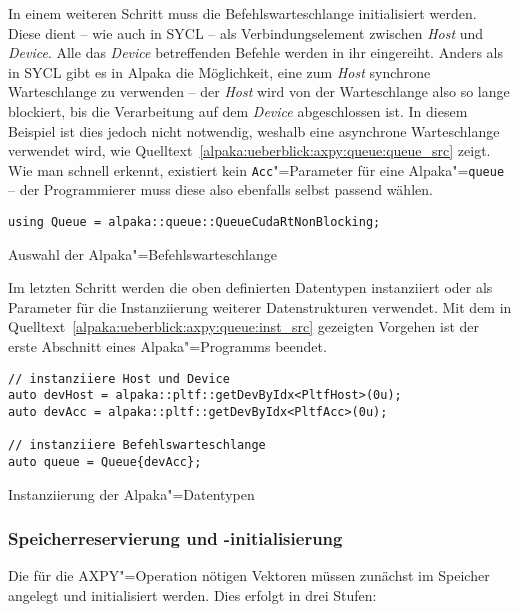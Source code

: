 In einem weiteren Schritt muss die Befehlswarteschlange initialisiert werden.
Diese dient -- wie auch in SYCL -- als Verbindungselement zwischen \textit{Host}
und \textit{Device}. Alle das \textit{Device} betreffenden Befehle werden in
ihr eingereiht. Anders als in SYCL gibt es in Alpaka die Möglichkeit, eine zum
\textit{Host} synchrone Warteschlange zu verwenden -- der \textit{Host} wird von
der Warteschlange also so lange blockiert, bis die Verarbeitung auf dem
\textit{Device} abgeschlossen ist. In diesem Beispiel ist dies jedoch nicht
notwendig, weshalb eine asynchrone Warteschlange verwendet wird, wie
Quelltext~\ref{alpaka:ueberblick:axpy:queue:queue_src} zeigt. Wie man schnell
erkennt, existiert kein \texttt{Acc}"=Parameter für eine Alpaka"=\texttt{queue}
-- der Programmierer muss diese also ebenfalls selbst passend wählen.

\begin{code}
    \begin{verbatim}
using Queue = alpaka::queue::QueueCudaRtNonBlocking;
    \end{verbatim}
    \caption{Auswahl der Alpaka"=Befehlswarteschlange}
    \label{alpaka:ueberblick:axpy:queue:queue_src}
\end{code}

Im letzten Schritt werden die oben definierten Datentypen instanziiert oder als
Parameter für die Instanziierung weiterer Datenstrukturen verwendet. Mit dem
in Quelltext~\ref{alpaka:ueberblick:axpy:queue:inst_src} gezeigten Vorgehen ist
der erste Abschnitt eines Alpaka"=Programms beendet.

\begin{code}
    \begin{verbatim}
// instanziiere Host und Device
auto devHost = alpaka::pltf::getDevByIdx<PltfHost>(0u);
auto devAcc = alpaka::pltf::getDevByIdx<PltfAcc>(0u);

// instanziiere Befehlswarteschlange
auto queue = Queue{devAcc};
    \end{verbatim}
    \caption{Instanziierung der Alpaka"=Datentypen}
    \label{alpaka:ueberblick:axpy:queue:inst_src}
\end{code}

\subsubsection{Speicherreservierung und -initialisierung}
\label{alpaka:ueberblick:axpy:buffer}

Die für die AXPY"=Operation nötigen Vektoren müssen zunächst im Speicher
angelegt und initialisiert werden. Dies erfolgt in drei Stufen:

